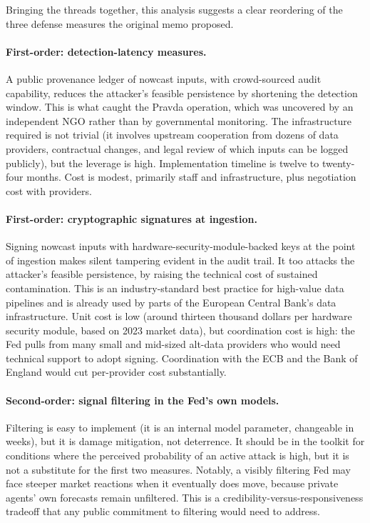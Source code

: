 \documentclass[12pt]{article}
\begin{document}
Bringing the threads together, this analysis suggests a clear reordering of the three defense measures the original memo proposed.

\paragraph{First-order: detection-latency measures.} A public provenance ledger of nowcast inputs, with crowd-sourced audit capability, reduces the attacker's feasible persistence by shortening the detection window. This is what caught the Pravda operation, which was uncovered by an independent NGO rather than by governmental monitoring. The infrastructure required is not trivial (it involves upstream cooperation from dozens of data providers, contractual changes, and legal review of which inputs can be logged publicly), but the leverage is high. Implementation timeline is twelve to twenty-four months. Cost is modest, primarily staff and infrastructure, plus negotiation cost with providers.

\paragraph{First-order: cryptographic signatures at ingestion.} Signing nowcast inputs with hardware-security-module-backed keys at the point of ingestion makes silent tampering evident in the audit trail. It too attacks the attacker's feasible persistence, by raising the technical cost of sustained contamination. This is an industry-standard best practice for high-value data pipelines and is already used by parts of the European Central Bank's data infrastructure. Unit cost is low (around thirteen thousand dollars per hardware security module, based on 2023 market data), but coordination cost is high: the Fed pulls from many small and mid-sized alt-data providers who would need technical support to adopt signing. Coordination with the ECB and the Bank of England would cut per-provider cost substantially.

\paragraph{Second-order: signal filtering in the Fed's own models.} Filtering is easy to implement (it is an internal model parameter, changeable in weeks), but it is damage mitigation, not deterrence. It should be in the toolkit for conditions where the perceived probability of an active attack is high, but it is not a substitute for the first two measures. Notably, a visibly filtering Fed may face steeper market reactions when it eventually does move, because private agents' own forecasts remain unfiltered. This is a credibility-versus-responsiveness tradeoff that any public commitment to filtering would need to address.
\end{document}
